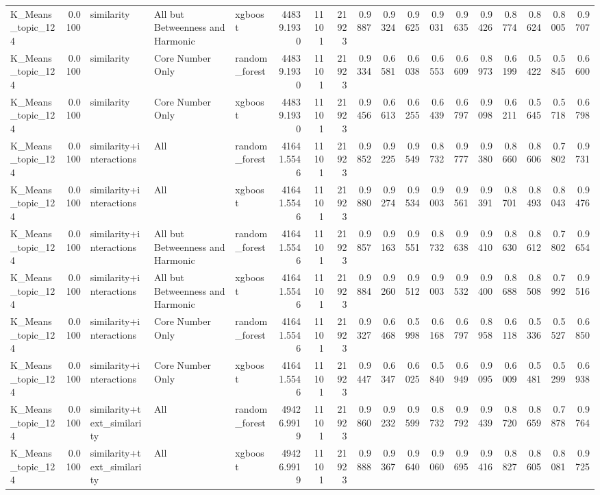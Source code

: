 \begin{tabular}{lrlllrrrrrrrrrrrrr}
K_Means_topic_124 & 0.0100 & similarity & All but Betweenness and Harmonic & xgboost & 44839.1930 & 11101 & 21923 & 0.9887 & 0.9324 & 0.9625 & 0.9031 & 0.9635 & 0.9426 & 0.8774 & 0.8624 & 0.8005 & 0.9707 \\
K_Means_topic_124 & 0.0100 & similarity & Core Number Only & random_forest & 44839.1930 & 11101 & 21923 & 0.9334 & 0.6581 & 0.6038 & 0.6553 & 0.6609 & 0.8973 & 0.6199 & 0.5422 & 0.5845 & 0.6600 \\
K_Means_topic_124 & 0.0100 & similarity & Core Number Only & xgboost & 44839.1930 & 11101 & 21923 & 0.9456 & 0.6613 & 0.6255 & 0.6439 & 0.6797 & 0.9098 & 0.6211 & 0.5645 & 0.5718 & 0.6798 \\
K_Means_topic_124 & 0.0100 & similarity+interactions & All & random_forest & 41641.5546 & 11101 & 21923 & 0.9852 & 0.9225 & 0.9549 & 0.8732 & 0.9777 & 0.9380 & 0.8660 & 0.8606 & 0.7802 & 0.9731 \\
K_Means_topic_124 & 0.0100 & similarity+interactions & All & xgboost & 41641.5546 & 11101 & 21923 & 0.9880 & 0.9274 & 0.9534 & 0.9003 & 0.9561 & 0.9391 & 0.8701 & 0.8493 & 0.8043 & 0.9476 \\
K_Means_topic_124 & 0.0100 & similarity+interactions & All but Betweenness and Harmonic & random_forest & 41641.5546 & 11101 & 21923 & 0.9857 & 0.9163 & 0.9551 & 0.8732 & 0.9638 & 0.9410 & 0.8630 & 0.8612 & 0.7802 & 0.9654 \\
K_Means_topic_124 & 0.0100 & similarity+interactions & All but Betweenness and Harmonic & xgboost & 41641.5546 & 11101 & 21923 & 0.9884 & 0.9260 & 0.9512 & 0.9003 & 0.9532 & 0.9400 & 0.8688 & 0.8508 & 0.7992 & 0.9516 \\
K_Means_topic_124 & 0.0100 & similarity+interactions & Core Number Only & random_forest & 41641.5546 & 11101 & 21923 & 0.9327 & 0.6468 & 0.5998 & 0.6168 & 0.6797 & 0.8958 & 0.6118 & 0.5336 & 0.5527 & 0.6850 \\
K_Means_topic_124 & 0.0100 & similarity+interactions & Core Number Only & xgboost & 41641.5546 & 11101 & 21923 & 0.9447 & 0.6347 & 0.6025 & 0.5840 & 0.6949 & 0.9095 & 0.6009 & 0.5481 & 0.5299 & 0.6938 \\
K_Means_topic_124 & 0.0100 & similarity+text_similarity & All & random_forest & 49426.9919 & 11101 & 21923 & 0.9860 & 0.9232 & 0.9599 & 0.8732 & 0.9792 & 0.9439 & 0.8720 & 0.8659 & 0.7878 & 0.9764 \\
K_Means_topic_124 & 0.0100 & similarity+text_similarity & All & xgboost & 49426.9919 & 11101 & 21923 & 0.9888 & 0.9367 & 0.9640 & 0.9060 & 0.9695 & 0.9416 & 0.8827 & 0.8605 & 0.8081 & 0.9725 \\

\end{tabular}
